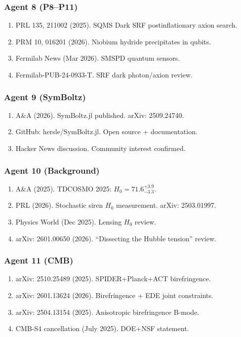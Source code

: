 \documentclass[11pt,a4paper]{article}
\begin{document}
\subsubsection{Agent 8 (P8--P11)}
\begin{enumerate}
\item PRL 135, 211002 (2025). SQMS Dark SRF postinflationary axion search.
\item PRM 10, 016201 (2026). Niobium hydride precipitates in qubits.
\item Fermilab News (Mar 2026). SMSPD quantum sensors.
\item Fermilab-PUB-24-0933-T. SRF dark photon/axion review.
\end{enumerate}

\subsubsection{Agent 9 (SymBoltz)}
\begin{enumerate}
\item A\&A (2026). SymBoltz.jl published. arXiv: 2509.24740.
\item GitHub: hersle/SymBoltz.jl. Open source + documentation.
\item Hacker News discussion. Community interest confirmed.
\end{enumerate}

\subsubsection{Agent 10 (Background)}
\begin{enumerate}
\item A\&A (2025). TDCOSMO 2025: $H_0 = 71.6^{+3.9}_{-3.3}$.
\item PRL (2026). Stochastic siren $H_0$ measurement. arXiv: 2503.01997.
\item Physics World (Dec 2025). Lensing $H_0$ review.
\item arXiv: 2601.00650 (2026). ``Dissecting the Hubble tension'' review.
\end{enumerate}

\subsubsection{Agent 11 (CMB)}
\begin{enumerate}
\item arXiv: 2510.25489 (2025). SPIDER+Planck+ACT birefringence.
\item arXiv: 2601.13624 (2026). Birefringence + EDE joint constraints.
\item arXiv: 2504.13154 (2025). Anisotropic birefringence B-mode.
\item CMB-S4 cancellation (July 2025). DOE+NSF statement.
\end{enumerate}
\end{document}
